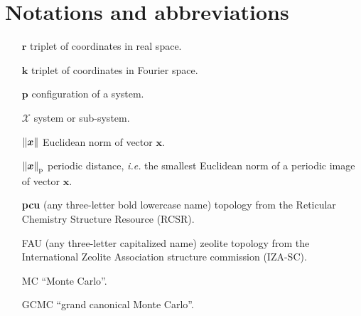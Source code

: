 \section*{Notations and abbreviations}
\begin{itemize}
    \item[$\boldsymbol r$] triplet of coordinates in real space.
    \item[$\boldsymbol k$] triplet of coordinates in Fourier space.
    \item[$\boldsymbol p$] configuration of a system.
    \item[$\mathcal X$] system or sub-system.
    \item[$\left\|\boldsymbol x\right\|$] Euclidean norm of vector $\boldsymbol x$.
    \item[$\left\|\boldsymbol x\right\|_\text{p}$] periodic distance, \textit{i.e.} the smallest Euclidean norm of a periodic image of vector $\boldsymbol x$.
    \item[\bfseries{pcu}] (any three-letter bold lowercase name) topology from the Reticular Chemistry Structure Resource (RCSR).
    \item[FAU] (any three-letter capitalized name) zeolite topology from the International Zeolite Association structure commission (IZA-SC).
    \item[MC] ``Monte Carlo''.
    \item[GCMC] ``grand canonical Monte Carlo''.
\end{itemize}
